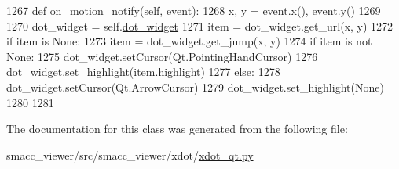 \begin{DoxyCode}
1267     \textcolor{keyword}{def }\hyperlink{classsmacc__viewer_1_1xdot_1_1xdot__qt_1_1NullAction_ac3c941c0798f90631d76549010e2c1e0}{on\_motion\_notify}(self, event):
1268         x, y = event.x(), event.y()
1269 
1270         dot\_widget = self.\hyperlink{classsmacc__viewer_1_1xdot_1_1xdot__qt_1_1DragAction_aca9ad68ec90fb5e319bb02770858da7a}{dot\_widget}
1271         item = dot\_widget.get\_url(x, y)
1272         \textcolor{keywordflow}{if} item \textcolor{keywordflow}{is} \textcolor{keywordtype}{None}:
1273             item = dot\_widget.get\_jump(x, y)
1274         \textcolor{keywordflow}{if} item \textcolor{keywordflow}{is} \textcolor{keywordflow}{not} \textcolor{keywordtype}{None}:
1275             dot\_widget.setCursor(Qt.PointingHandCursor)
1276             dot\_widget.set\_highlight(item.highlight)
1277         \textcolor{keywordflow}{else}:
1278             dot\_widget.setCursor(Qt.ArrowCursor)
1279             dot\_widget.set\_highlight(\textcolor{keywordtype}{None})
1280 
1281 
\end{DoxyCode}


The documentation for this class was generated from the following file\+:\begin{DoxyCompactItemize}
\item 
smacc\+\_\+viewer/src/smacc\+\_\+viewer/xdot/\hyperlink{xdot__qt_8py}{xdot\+\_\+qt.\+py}\end{DoxyCompactItemize}
